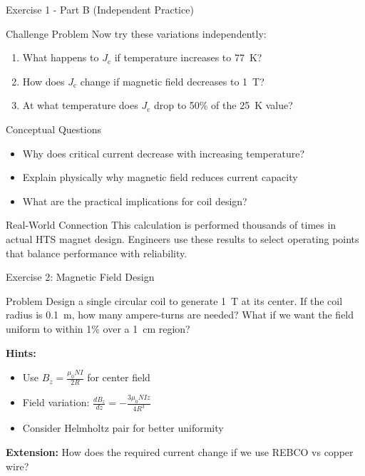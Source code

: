 \documentclass[aspectratio=169,xcolor={table,dvipsnames}]{beamer}
\newcommand{\Tesla}[1]{#1~T}
\newcommand{\Kelvin}[1]{#1~K}
\newcommand{\Jc}{J_\text{c}}
\begin{document}
\begin{frame}{Exercise 1 - Part B (Independent Practice)}
    \begin{block}{Challenge Problem}
        Now try these variations independently:
        \begin{enumerate}
            \item What happens to $\Jc$ if temperature increases to \Kelvin{77}?
            \item How does $\Jc$ change if magnetic field decreases to \Tesla{1}?
            \item At what temperature does $\Jc$ drop to 50\% of the \Kelvin{25} value?
        \end{enumerate}
    \end{block}
    
    \begin{block}{Conceptual Questions}
        \begin{itemize}
            \item Why does critical current decrease with increasing temperature?
            \item Explain physically why magnetic field reduces current capacity
            \item What are the practical implications for coil design?
        \end{itemize}
    \end{block}
    
    \begin{block}{Real-World Connection}
        This calculation is performed thousands of times in actual HTS magnet design. Engineers use these results to select operating points that balance performance with reliability.
    \end{block}
\end{frame}

\begin{frame}{Exercise 2: Magnetic Field Design}
    \begin{block}{Problem}
        Design a single circular coil to generate \Tesla{1} at its center.
        If the coil radius is 0.1~m, how many ampere-turns are needed?
        What if we want the field uniform to within 1\% over a 1~cm region?
    \end{block}
    
    \vspace{0.3cm}
    \textbf{Hints:}
    \begin{itemize}
        \item Use $B_z = \frac{\mu_0 N I}{2 R}$ for center field
        \item Field variation: $\frac{dB_z}{dz} = -\frac{3\mu_0 N I z}{4 R^3}$
        \item Consider Helmholtz pair for better uniformity
    \end{itemize}
    
    \vspace{0.3cm}
    \textbf{Extension:} How does the required current change if we use REBCO vs copper wire?
\end{frame}
\end{document}
